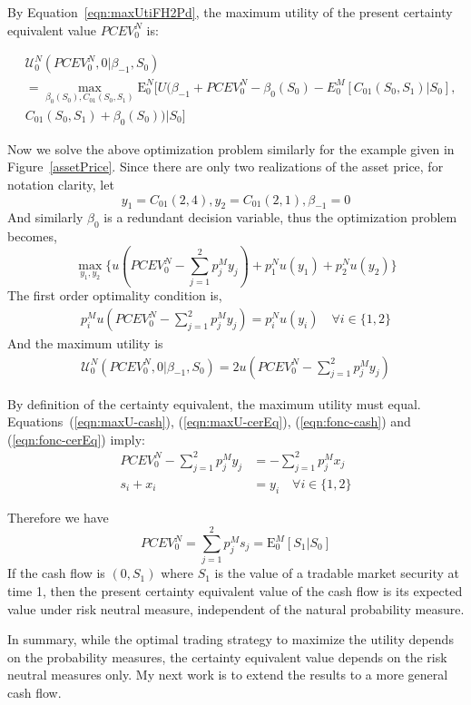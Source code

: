 \documentclass{article}[12pt letter]
\newcommand{\E}{\mathrm{E}}
\begin{document}
By Equation~\ref{eqn:maxUtiFH2Pd}, the maximum utility of the present certainty equivalent value $PCEV_0^N$  is:

\begin{align*}
&\mathcal{U}^N_0 (PCEV_0^N, 0|\beta_{-1},S_0)  \nonumber \\&= \max_{\beta_0(S_0), C_{01}(S_0,S_1)} \E_0^N [U(\beta_{-1} + PCEV_0^N - \beta_0(S_0) - E_0^M[C_{01}(S_0,S_1)|S_0], \\&C_{01}(S_0,S_1) + \beta_0(S_0))|S_0]
\end{align*}

Now we solve the above optimization problem similarly for the example given in Figure~\ref{assetPrice}. Since there are only two realizations of the asset price, for notation clarity, let
\[ y_1 = C_{01}(2,4), y_2 = C_{01}(2,1), \beta_{-1} = 0 \]
And similarly $\beta_0$ is a redundant decision variable, thus the optimization problem becomes,
\[ \max_{y_1,y_2} \{ u(PCEV_0^N-\sum_{j=1}^2p_j^M y_j) + p_1^Nu(y_1) + p_2^Nu(y_2)\}\]
The first order optimality condition is,
\begin{align} \label{eqn:fonc-cerEq}
p_i^M u(PCEV_0^N - \sum_{j=1}^2 p_j^M y_j) = p_i^N u(y_i) \quad \forall i\in \{1,2\} 
\end{align}
And the maximum utility is
\begin{align} \label{eqn:maxU-cerEq}
\mathcal{U}^N_0 (PCEV_0^N, 0|\beta_{-1},S_0)  =2u(PCEV_0^N-\sum_{j=1}^2 p_j^My_j)
\end{align}

By definition of the certainty equivalent, the maximum utility must equal. Equations~(\ref{eqn:maxU-cash}), (\ref{eqn:maxU-cerEq}), (\ref{eqn:fonc-cash}) and (\ref{eqn:fonc-cerEq}) imply:
\begin{align}
PCEV_0^N - \sum_{j=1}^2 p_j^My_j &= -\sum_{j=1}^2 p_j^Mx_j \\
s_i + x_i &= y_i \quad \forall i \in \{1,2\} \label{eqn:s_i}
\end{align}

Therefore we have
\[PCEV_0^N = \sum_{j=1}^2 p_j^M s_j  = \E_0^M[S_1|S_0]\]
{\lemma If the cash flow is $(0,S_1)$ where $S_1$ is the value of a tradable market security at time 1, then the present certainty equivalent value of the cash flow is its expected value under risk neutral measure, independent of the natural probability measure.}


In summary, while the optimal trading strategy to maximize the utility depends on the probability measures, the certainty equivalent value depends on the risk neutral measures only. My next work is to extend the results to a more general cash flow.
\end{document}
